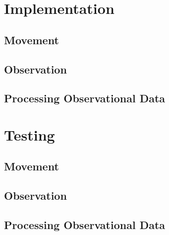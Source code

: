 		
	\chapter{Implementation}
		\section{Movement}
		\section{Observation}
		\section{Processing Observational Data}
		
	\chapter{Testing}
		\section{Movement}
		\section{Observation}
		\section{Processing Observational Data}